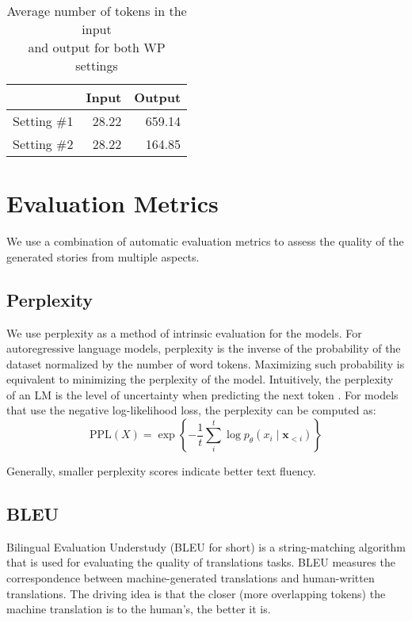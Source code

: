 \begin{table}[ht]
\centering
\begin{tabular}{l|rr}
            & Input & Output \\ \hline
Setting \#1 & 28.22 & 659.14 \\
Setting \#2 & 28.22 & 164.85 \\
\end{tabular}
\caption{Average number of tokens in the input \\ and output for both WP settings}
\label{tab:wp-statistics}
\end{table}



\section{Evaluation Metrics}
\label{sec:eval_metrics}

We use a combination of automatic evaluation metrics to assess the quality of the generated stories from multiple aspects.

\subsection{Perplexity}
\label{sec:perplexity}

We use perplexity as a method of intrinsic evaluation for the models. For autoregressive language models, perplexity is the inverse of the probability of the dataset normalized by the number of word tokens. Maximizing such probability is equivalent to minimizing the perplexity of the model. Intuitively, the perplexity of an LM is the level of uncertainty when predicting the next token \citep{chip2019evaluation}. For models that use the negative log-likelihood loss, the perplexity can be computed as:
\[ \text{PPL}(X) = \exp \left\{ - \frac{1}{t} \sum_{i}^{t} \log p_{\theta} (x_i \mid \mathbf{x}_{<i})  \right\} \]

Generally, smaller perplexity scores indicate better text fluency.



\subsection{BLEU}
\label{sec:bleu}

Bilingual Evaluation Understudy (BLEU for short) \citep{papineni2002bleu} is a string-matching algorithm that is used for evaluating the quality of translations tasks. BLEU measures the correspondence between machine-generated translations and human-written translations.%
The driving idea is that the closer (more overlapping tokens) the machine translation is to the human's, the better it is.

